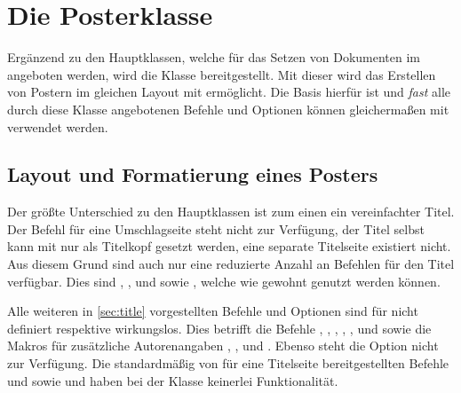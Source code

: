 \chapter[Die Klasse tudscrposter]{Die Posterklasse}
%
%
\begin{Bundle*}[v2.05]{}
%
\printchangedatlist%
%
Ergänzend zu den Hauptklassen, welche für das Setzen von Dokumenten im \TUDCD 
angeboten werden, wird die Klasse  bereitgestellt. Mit 
dieser wird das Erstellen von Postern im gleichen Layout mit  
ermöglicht. Die Basis hierfür ist  und \emph{fast} alle 
durch diese Klasse angebotenen Befehle und Optionen können gleichermaßen mit 
 verwendet werden. 

\section{Layout und Formatierung eines Posters}
%
%
%
Der größte Unterschied zu den Hauptklassen ist zum einen ein vereinfachter 
Titel. Der Befehl  für eine Umschlagseite steht nicht zur 
Verfügung, der Titel selbst kann mit  nur als Titelkopf 
gesetzt werden, eine separate Titelseite existiert nicht. Aus diesem Grund sind 
auch nur eine reduzierte Anzahl an Befehlen für den Titel verfügbar. Dies sind 
, ,  und  
sowie , welche wie gewohnt genutzt werden können.

Alle weiteren in \autoref{sec:title} vorgestellten Befehle und Optionen sind 
für  nicht definiert respektive wirkungslos. Dies betrifft 
die Befehle , , , 
, ,  und  
sowie die Makros für zusätzliche Autorenangaben , 
,  und . 
Ebenso steht die Option  nicht zur Verfügung. Die 
standardmäßig von \KOMAScript{} für eine Titelseite bereitgestellten Befehle 
 und  sowie  und 
 haben bei der Klasse  keinerlei 
Funktionalität. 










\end{Bundle*}
